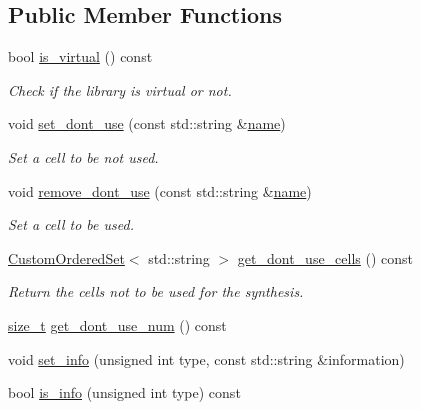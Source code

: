 \subsection*{Public Member Functions}
\begin{DoxyCompactItemize}
\item 
bool \hyperlink{classlibrary__manager_a3622c3c263ac844696f221967db3af38}{is\+\_\+virtual} () const
\begin{DoxyCompactList}\small\item\em Check if the library is virtual or not. \end{DoxyCompactList}\item 
void \hyperlink{classlibrary__manager_aff9014fb417452bac4f6ab7942038f42}{set\+\_\+dont\+\_\+use} (const std\+::string \&\hyperlink{classlibrary__manager_a6d92e10c68ec4a2975d832b0650c7168}{name})
\begin{DoxyCompactList}\small\item\em Set a cell to be not used. \end{DoxyCompactList}\item 
void \hyperlink{classlibrary__manager_a0cda95a89f54b1af796a67f7d871acc0}{remove\+\_\+dont\+\_\+use} (const std\+::string \&\hyperlink{classlibrary__manager_a6d92e10c68ec4a2975d832b0650c7168}{name})
\begin{DoxyCompactList}\small\item\em Set a cell to be used. \end{DoxyCompactList}\item 
\hyperlink{classCustomOrderedSet}{Custom\+Ordered\+Set}$<$ std\+::string $>$ \hyperlink{classlibrary__manager_a6906feae6af8bf096f52848de12479fa}{get\+\_\+dont\+\_\+use\+\_\+cells} () const
\begin{DoxyCompactList}\small\item\em Return the cells not to be used for the synthesis. \end{DoxyCompactList}\item 
\hyperlink{tutorial__fpt__2017_2intro_2sixth_2test_8c_a7c94ea6f8948649f8d181ae55911eeaf}{size\+\_\+t} \hyperlink{classlibrary__manager_aa04c3b1e52eadbd800212b36b8770b2a}{get\+\_\+dont\+\_\+use\+\_\+num} () const
\item 
void \hyperlink{classlibrary__manager_acdc0bce98076c59ca92b316fcb11ab13}{set\+\_\+info} (unsigned int type, const std\+::string \&information)
\item 
bool \hyperlink{classlibrary__manager_a926d994ff986bfee4adf363c88ce5acf}{is\+\_\+info} (unsigned int type) const

\end{DoxyCompactItemize}

